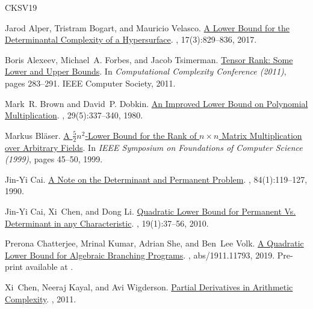 \documentclass[10pt,a4paper]{article}
\begin{document}
\begin{thebibliography}{CKSV19}

Jarod Alper, Tristram Bogart, and Mauricio Velasco.
\newblock \href {http://dx.doi.org/10.1007/s10208-015-9300-x} {A Lower Bound
  for the Determinantal Complexity of a Hypersurface}.
, 17(3):829--836, 2017.

Boris Alexeev, Michael~A. Forbes, and Jacob Tsimerman.
\newblock \href {http://dx.doi.org/10.1109/CCC.2011.28} {Tensor Rank: Some
  Lower and Upper Bounds}.
\newblock In {\em Computational Complexity Conference (2011)}, pages 283--291. {IEEE} Computer Society, 2011.

Mark~R. Brown and David~P. Dobkin.
\newblock \href {http://dx.doi.org/10.1109/TC.1980.1675583} {An Improved Lower
  Bound on Polynomial Multiplication}.
, 29(5):337--340, 1980.

Markus Bl{\"{a}}ser.
\newblock \href {http://dx.doi.org/10.1109/SFFCS.1999.814576} {A {$\frac52
  n^2$}-Lower Bound for the Rank of {$n \times n$} Matrix Multiplication over
  Arbitrary Fields}.
\newblock In {\em IEEE Symposium on Foundations of Computer Science (1999)}, pages 45--50, 1999.

Jin{-}Yi Cai.
\newblock \href {http://dx.doi.org/10.1016/0890-5401(90)90036-H} {A Note on the
  Determinant and Permanent Problem}.
, 84(1):119--127, 1990.

Jin{-}Yi Cai, Xi~Chen, and Dong Li.
\newblock \href {http://dx.doi.org/10.1007/s00037-009-0284-2} {Quadratic Lower
  Bound for Permanent Vs. Determinant in any Characteristic}.
, 19(1):37--56, 2010.

Prerona Chatterjee, Mrinal Kumar, Adrian She, and Ben~Lee Volk.
\newblock \href {http://arxiv.org/abs/1911.11793} {A Quadratic Lower Bound for
  Algebraic Branching Programs}.
, abs/1911.11793, 2019.
\newblock Pre-print available at \href {http://arxiv.org/abs/1911.11793}
  {}.

Xi~Chen, Neeraj Kayal, and Avi Wigderson.
\newblock \href {http://dx.doi.org/10.1561/0400000043} {Partial Derivatives in
  Arithmetic Complexity}.
, 2011.


\end{thebibliography}
\end{document}

